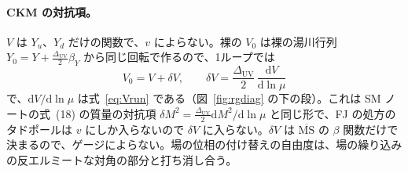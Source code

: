 \documentclass[a4paper,10pt]{ltjsarticle}
\newcommand{\dd}{\mathrm{d}}
\newcommand{\MSbar}{\overline{\mathrm{MS}}}
\newcommand{\DUV}{\Delta_{\mathrm{UV}}}
\begin{document}
\paragraph{CKM の対抗項。}$V$ は $Y_u$、$Y_d$ だけの関数で、$v$ によらない。裸の $V_0$ は裸の湯川行列 $Y_0=Y+\frac{\DUV}2\beta_Y$ から同じ回転で作るので、1ループでは
\begin{equation}
V_0=V+\delta V,\qquad \delta V=\frac{\DUV}2\,\frac{\dd V}{\dd\ln\mu}
\label{eq:dV}
\end{equation}
で、$\dd V/\dd\ln\mu$ は式~\eqref{eq:Vrun} である（図~\ref{fig:rgdiag} の下の段）。これは SM ノートの式~(18) の質量の対抗項 $\delta M^2=\frac{\DUV}2\dd M^2/\dd\ln\mu$ と同じ形で、FJ の処方のタドポールは $v$ にしか入らないので $\delta V$ に入らない。$\delta V$ は $\MSbar$ の $\beta$ 関数だけで決まるので、ゲージによらない。場の位相の付け替えの自由度は、場の繰り込みの反エルミートな対角の部分と打ち消し合う。
\end{document}
